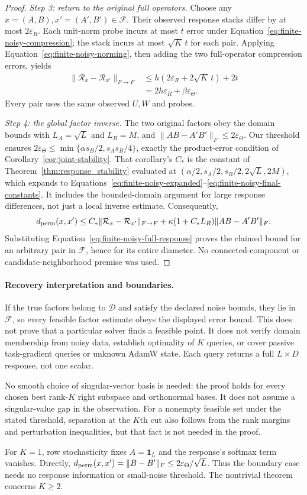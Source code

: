 \begin{proof}
\emph{Step 3: return to the original full operators.}
Choose any $x=(A,B),x'=(A',B')\in\mathcal F$.
Their observed response stacks differ by at most $2\varepsilon_R$.
Each unit-norm probe incurs at most $t$ error under
Equation~\ref{eq:finite-noisy-compression}; the stack incurs at most
$\sqrt K\,t$ for each pair. Applying
Equation~\ref{eq:finite-noisy-norming}, then adding the two full-operator
compression errors, yields
\begin{align}
 \|\mathcal R_x-\mathcal R_{x'}\|_{F\to F}
 &\le h(2\varepsilon_R+2\sqrt K\,t)+2t\\
 &=2h\varepsilon_R+\beta\varepsilon_\Theta.
 \label{eq:finite-noisy-full-response}
\end{align}
Every pair uses the same observed $U,W$ and probes.

\emph{Step 4: the global factor inverse.}
The two original factors obey the domain bounds with
$L_A=\sqrt L$ and $L_B=M$, and
$\|AB-A'B'\|_F\le2\varepsilon_\Theta$.
Our threshold ensures
$2\varepsilon_\Theta\le\min\{\alpha s_B/2,s_As_B/4\}$,
exactly the product-error condition of
Corollary~\ref{cor:joint-stability}.
That corollary's $C_*$ is the constant of
Theorem~\ref{thm:response_stability} evaluated at
$(\alpha/2,s_A/2,s_B/2,2\sqrt L,2M)$, which expands to
Equations~\ref{eq:finite-noisy-expanded}--\ref{eq:finite-noisy-final-constants}.
It includes the bounded-domain argument for large response differences,
not just a local inverse estimate.
Consequently,
\[
 d_{\rm perm}(x,x')
 \le C_*\|\mathcal R_x-\mathcal R_{x'}\|_{F\to F}
       +\kappa(1+C_*L_R)\|AB-A'B'\|_F.
\]
Substituting Equation~\ref{eq:finite-noisy-full-response} proves the claimed
bound for an arbitrary pair in $\mathcal F$, hence for its entire diameter.
No connected-component or candidate-neighborhood premise was used.
\end{proof}

\paragraph{Recovery interpretation and boundaries.}
If the true factors belong to $\mathcal D$ and satisfy the declared noise
bounds, they lie in $\mathcal F$, so every feasible factor estimate obeys
the displayed error bound. This does not prove that a particular solver
finds a feasible point. It does not verify domain membership from noisy
data, establish optimality of $K$ queries, or cover passive task-gradient
queries or unknown AdamW state. Each query returns a full $L\times D$
response, not one scalar.

No smooth choice of singular-vector basis is needed: the proof holds for
every chosen best rank-$K$ right subspace and orthonormal bases.
It does not assume a singular-value gap in the observation. For a nonempty
feasible set under the stated threshold, separation at the $K$th cut also
follows from the rank margins and perturbation inequalities, but that
fact is not needed in the proof.

For $K=1$, row stochasticity fixes $A=\mathbf1_L$ and the response's
softmax term vanishes. Directly,
$d_{\rm perm}(x,x')=\|B-B'\|_F\le2\varepsilon_\Theta/\sqrt L$.
Thus the boundary case needs no response information or small-noise
threshold. The nontrivial theorem concerns $K\ge2$.
